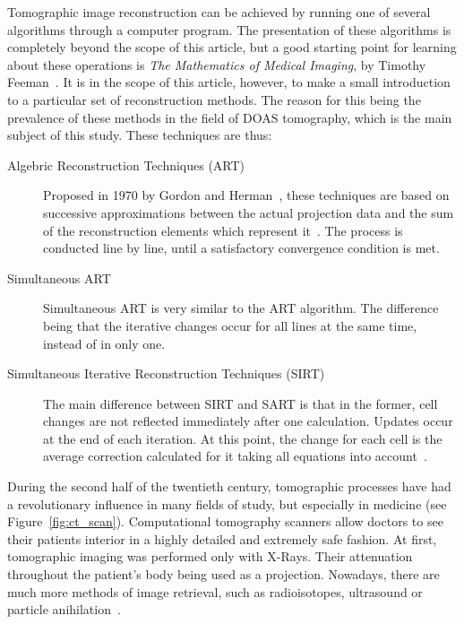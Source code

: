 Tomographic image reconstruction can be achieved by running one of
several algorithms through a computer program. The presentation of these
algorithms is completely beyond the scope of this article, but a good
starting point for learning about these operations is \emph{The
Mathematics of Medical Imaging}, by Timothy Feeman~\cite{Feeman2010}. It
is in the scope of this article, however, to make a small introduction
to a particular set of reconstruction methods. The reason for this being
the prevalence of these methods in the field of DOAS tomography, which
is the main subject of this study. These techniques are thus:
\begin{description}
    \item[Algebric Reconstruction Techniques (ART)] Proposed in 1970 by
        Gordon and Herman~\cite{Herman1973}, these techniques are based
        on successive approximations between the actual projection data
        and the sum of the reconstruction elements which represent
        it~\cite{Gordon1974}. The process is conducted line by line,
        until a satisfactory convergence condition is met.

    \item[Simultaneous ART] Simultaneous ART is very similar to the ART
        algorithm. The difference being that the iterative changes occur
        for all lines at the same time, instead of in only one.

    \item[Simultaneous Iterative Reconstruction Techniques (SIRT)] The
        main difference between SIRT and SART is that in the former,
        cell changes are not reflected immediately after one
        calculation. Updates occur at the end of each iteration. At this
        point, the change for each cell is the average correction
        calculated for it taking all equations into
        account~\cite{Kak2001}.
\end{description}

During the second half of the twentieth century, tomographic processes
have had a revolutionary influence in many fields of study, but
especially in medicine (see Figure~\ref{fig:ct_scan}). Computational
tomography scanners allow doctors to see their patients interior in a
highly detailed and extremely safe fashion. At first, tomographic
imaging was performed only with X-Rays.  Their attenuation throughout
the patient's body being used as a projection. Nowadays, there are much
more methods of image retrieval, such as radioisotopes, ultrasound or
particle anihilation~\cite{Kak2001a, Feeman2010, Herman2009}.

